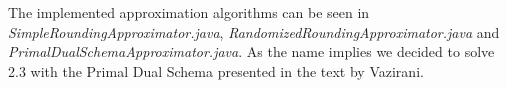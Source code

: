 \noindent
The implemented approximation algorithms can be seen in \textit{SimpleRoundingApproximator.java}, \textit{RandomizedRoundingApproximator.java} and \textit{PrimalDualSchemaApproximator.java}. As the name implies we decided to solve 2.3 with the Primal Dual Schema presented in the text by Vazirani.

